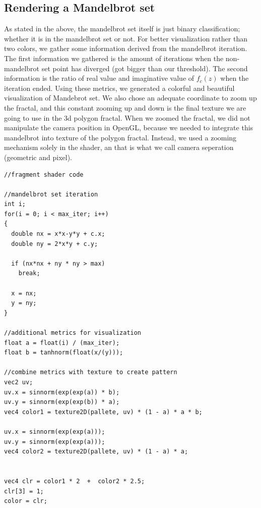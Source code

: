 \documentclass[a4paper]{article}
\begin{document}
\subsection{Rendering a Mandelbrot set}
As stated in the above, the mandelbrot set itself is just binary classification; whether it is in the mandelbrot set or not.
For better visualization rather than two colors, we gather some information derived from the mandelbrot iteration.
The first information we gathered is the amount of iterations when the non-mandelbrot set point has diverged (got bigger than our threshold).
The second information is the ratio of real value and imaginative value of $f_c(z)$ when the iteration ended.
Using these metrics, we generated a colorful and beautiful visualization of Mandebrot set.
We also chose an adequate coordinate to zoom up the fractal, and this constant zooming up and down is the final texture we are going to use in the 3d polygon fractal.
When we zoomed the fractal, we did not manipulate the camera position in OpenGL, because we needed to integrate this mandelbrot into texture of the polygon fractal. 
Instead, we used a zooming mechanism solely in the shader, an that is what we call camera seperation (geometric and pixel).
\begin{lstlisting}[style=CStyle]
//fragment shader code

//mandelbrot set iteration
int i;
for(i = 0; i < max_iter; i++)
{
  double nx = x*x-y*y + c.x;
  double ny = 2*x*y + c.y;

  if (nx*nx + ny * ny > max)
    break;

  x = nx;
  y = ny;
}

//additional metrics for visualization
float a = float(i) / (max_iter);
float b = tanhnorm(float(x/(y)));

//combine metrics with texture to create pattern
vec2 uv;
uv.x = sinnorm(exp(exp(a)) * b);
uv.y = sinnorm(exp(exp(b)) * a);
vec4 color1 = texture2D(pallete, uv) * (1 - a) * a * b;

uv.x = sinnorm(exp(exp(a)));
uv.y = sinnorm(exp(exp(a)));
vec4 color2 = texture2D(pallete, uv) * (1 - a) * a;


vec4 clr = color1 * 2  +  color2 * 2.5;
clr[3] = 1;
color = clr;
\end{lstlisting}
\end{document}
